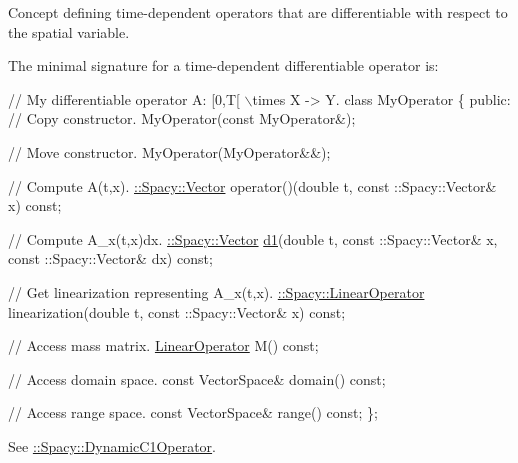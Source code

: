 Concept defining time-\/dependent operators that are differentiable with respect to the spatial variable. 

\label{group__ConceptGroup_gaa7ef0ce2d66b0610035541b580564b11_DynamicC1OperatorConceptAnchor}%
\hypertarget{group__ConceptGroup_gaa7ef0ce2d66b0610035541b580564b11_DynamicC1OperatorConceptAnchor}{}%
The minimal signature for a time-\/dependent differentiable operator is\+: 
\begin{DoxyCode}
\textcolor{comment}{// My differentiable operator A: [0,T[ \(\backslash\)times X -> Y.}
\textcolor{keyword}{class }MyOperator
\{
\textcolor{keyword}{public}:
  \textcolor{comment}{// Copy constructor.}
  MyOperator(\textcolor{keyword}{const} MyOperator&);

  \textcolor{comment}{// Move constructor.}
  MyOperator(MyOperator&&);

  \textcolor{comment}{// Compute A(t,x).}
  \hyperlink{classSpacy_1_1Vector}{::Spacy::Vector} operator()(\textcolor{keywordtype}{double} t, const ::Spacy::Vector& x) \textcolor{keyword}{const};

  \textcolor{comment}{// Compute A\_x(t,x)dx.}
  \hyperlink{classSpacy_1_1Vector}{::Spacy::Vector} \hyperlink{group__SpacyGroup_gab6646eb7068eb9f1369e639cf0b620a2_gab6646eb7068eb9f1369e639cf0b620a2}{d1}(\textcolor{keywordtype}{double} t, const ::Spacy::Vector& x, const ::Spacy::Vector& dx) \textcolor{keyword}{const};

  \textcolor{comment}{// Get linearization representing A\_x(t,x).}
 \hyperlink{group__SpacyGroup_ga584f7b9d82a844302ba0d77c3a1b6640_ga584f7b9d82a844302ba0d77c3a1b6640}{::Spacy::LinearOperator} linearization(\textcolor{keywordtype}{double} t, const ::Spacy::Vector& x) \textcolor{keyword}{const};

  \textcolor{comment}{// Access mass matrix.}
  \hyperlink{group__SpacyGroup_ga584f7b9d82a844302ba0d77c3a1b6640_ga584f7b9d82a844302ba0d77c3a1b6640}{LinearOperator} M() \textcolor{keyword}{const};

  \textcolor{comment}{// Access domain space.}
  \textcolor{keyword}{const} VectorSpace& domain() \textcolor{keyword}{const};

  \textcolor{comment}{// Access range space.}
  \textcolor{keyword}{const} VectorSpace& range() \textcolor{keyword}{const};
\};
\end{DoxyCode}


See \hyperlink{group__SpacyGroup_gabc9c830d2a7e020bcab097b10ee6f642_DynamicC1OperatorAnchor}{\+:\+:Spacy\+:\+:Dynamic\+C1\+Operator}. \hypertarget{group__ConceptGroup_ga30692db093ead5a1a074905363a2f043_ga30692db093ead5a1a074905363a2f043}{}

